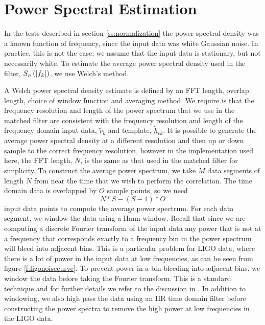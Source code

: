 \section{Power Spectral Estimation}
\label{ss:psd}

In the tests described in section \ref{ss:normalization} the power spectral
density was a known function of frequency, since the input data was white
Gaussian noise. In practice, this is not the case; we assume that the input
data is stationary, but not necessarily white. To estimate the average power
spectral density used in the filter, $S_n\left(\left|f_{k}\right|\right)$, we use Welch's
method\cite{Welch:1967}. 

A Welch power spectral density estimate is defined by an FFT length, overlap
length, choice of window function and averaging method. We require is that the
frequency resolution and length of the power spectrum that we use in the
matched filter are consistent with the frequency resolution and length of the
frequency domain input data, $\tilde{v}_k$ and template, $\tilde{h}_{ck}$. It
is possible to generate the average power spectral density at a different
resolution and then up or down sample to the correct frequency resolution,
however in the implementation used here, the FFT length, $N$, is the same as
that used in the matched filter for simplicity.  To construct the average
power spectrum, we take $M$ data segments of length $N$ from near the time
that we wish to perform the correlation. The time domain data is overlapped
by $O$ sample points, so we need
\begin{equation}
N * S - ( S - 1 ) * O
\end{equation}
input data points to compute the average power spectrum. For each data
segment, we window the data using a Hann window. Recall that since we are
computing a discrete Fourier transform of the input data any power that is not
at a frequency that corresponds exactly to a frequency bin in the power
spectrum will bleed into adjacent bins. This is a particular problem for LIGO
data, where there is a lot of power in the input data at low frequencies, as
can be seen from figure \ref{f:ligonoisecurve}. To prevent power in a
bin bleeding into adjacent bins, we window the data before taking the Fourier
transform. This is a standard technique and for further details we refer to the
discussion in \cite{Press:1992}. In addition to windowing, we also high pass the
data using an IIR time domain filter before constructing the power spectra to
remove the high power at low frequencies in the LIGO data.

